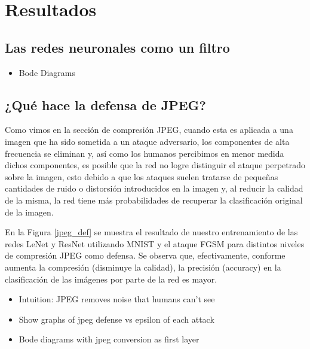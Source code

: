 \section{Resultados}
\subsection{Las redes neuronales como un filtro}
\begin{itemize}
    \item Bode Diagrams
\end{itemize}
\subsection{¿Qué hace la defensa de JPEG?}

Como vimos en la sección de compresión JPEG, cuando esta es aplicada a una imagen que ha sido sometida a un ataque adversario, los componentes de alta frecuencia se eliminan y, así como los humanos percibimos en menor medida dichos componentes, es posible que la red no logre distinguir el ataque perpetrado sobre la imagen, esto debido a que los ataques suelen tratarse de pequeñas cantidades de ruido o distorsión introducidos en la imagen y, al reducir la calidad de la misma, la red tiene más probabilidades de recuperar la clasificación original de la imagen.

En la Figura \ref{jpeg_def} se muestra el resultado de nuestro entrenamiento de las redes LeNet y ResNet utilizando MNIST y el ataque FGSM para distintos niveles de compresión JPEG como defensa. Se observa que, efectivamente, conforme aumenta la compresión (disminuye la calidad), la precisión (accuracy) en la clasificación de las imágenes por parte de la red es mayor.

\begin{itemize}
    \item Intuition: JPEG removes noise that humans can't see
    \item Show graphs of jpeg defense vs epsilon of each attack
    \item Bode diagrams with jpeg conversion as first layer
\end{itemize}

